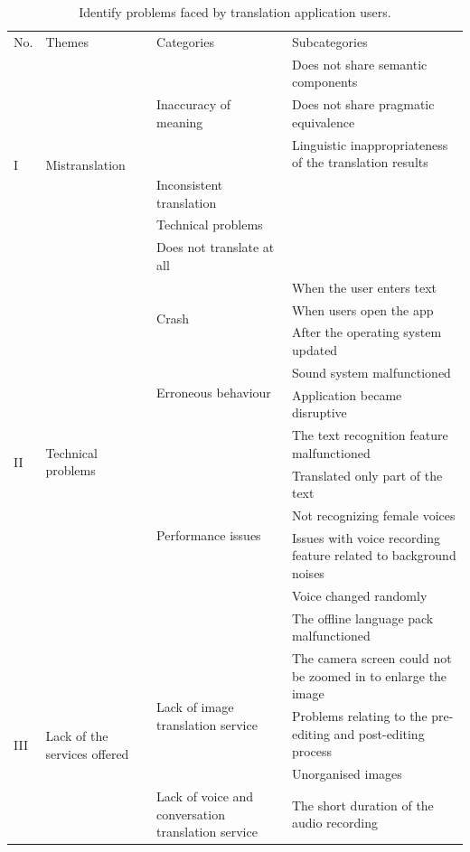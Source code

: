 \documentclass[english]{textolivre}
\begin{document}
\begin{longtable}{p{1cm} p{2.5cm} p{4.5cm} p{5cm}}
\caption{Identify problems faced by translation application users.}
\label{tbl2}
\footnotesize
\\
\toprule
No. & Themes & Categories & Subcategories \\ 
\midrule
\multirow{6}{=}{I} & \multirow{6}{=}{Mistranslation} & \multirow{3}{=}{Inaccuracy of meaning} & Does not share semantic components \\
& & & Does not share pragmatic equivalence \\
& & & Linguistic inappropriateness of the translation results \\
\cmidrule{3-4}
& & Inconsistent translation & \cellcolor[HTML]{EFEFEF} \\
\cmidrule{3-4}
& & Technical problems & \cellcolor[HTML]{EFEFEF} \\
\cmidrule{3-4}
& & Does not translate at all & \cellcolor[HTML]{EFEFEF} \\
\midrule
\multirow{11}{=}{II} & \multirow{11}{=}{Technical problems} & \multirow{3}{=}{Crash} & When the user enters text \\
& & & When users open the app \\
& & & After the operating system updated \\
\cmidrule{3-4}
& & \multirow{2}{=}{Erroneous behaviour} & Sound system malfunctioned \\
& & & Application became disruptive \\
\cmidrule{3-4}
& & \multirow{6}{=}{Performance issues} & The text recognition feature malfunctioned \\
& & & Translated only part of the text \\
& & & Not recognizing female voices \\
& & & Issues with voice recording feature related to background noises \\
& & & Voice changed randomly \\
& & & The offline language pack malfunctioned \\
\midrule
\multirow{9}{=}{III} & \multirow{9}{=}{Lack of the services offered} & \multirow{3}{=}{Lack of image translation service} & The camera screen could not be zoomed in to enlarge the image \\
& & & Problems relating to the pre-editing and post-editing process \\
& & & Unorganised images \\
\cmidrule{3-4}
& & \multirow{3}{=}{Lack of voice and conversation translation service} & The short duration of the audio recording \\

\end{longtable}
\end{document}
